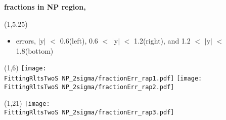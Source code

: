 \documentclass[11pt,slidescentered,red,compress,handout,hyperref={bookmarks=true},mathseriftable]{beamer}
\newcommand{\FittingRltsTwoS}{../Psi2S/Fit/parameter/evaluateCtau/}
\begin{document}
\begin{frame}[t]{\small \bf fractions in NP region,  }{}
\begin{textblock}{48}(1,5.25)
\begin{itemize}
\scriptsize \item errors, $|$y$|$ $<$ 0.6(left), 0.6 $<$ $|$y$|$ $<$ 1.2(right), and 1.2 $<$ $|$y$|$ $<$ 1.8(bottom)
\end{itemize}
\end{textblock}
\begin{textblock}{48}(1,6)
\hspace*{10pt} \texttt{[image: \\FittingRltsTwoS NP\_2sigma/fractionErr\_rap1.pdf]}
\hspace*{10pt} \texttt{[image: \\FittingRltsTwoS NP\_2sigma/fractionErr\_rap2.pdf]}
\begin{textblock}{48}(1,21)
\hspace*{10pt} \texttt{[image: \\FittingRltsTwoS NP\_2sigma/fractionErr\_rap3.pdf]}
\end{textblock}
\end{textblock}
\end{frame}
\end{document}
